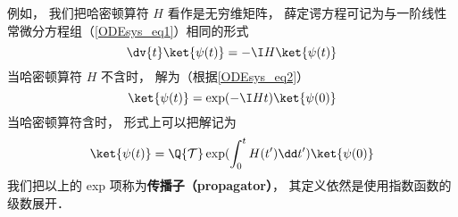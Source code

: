 例如， 我们把哈密顿算符 $H$ 看作是无穷维矩阵， 薛定谔方程可记为与一阶线性常微分方程组（\autoref{ODEsys_eq1}）相同的形式
\begin{equation}
\dv{t} \ket{\psi(t)} = -\I H \ket{\psi(t)}
\end{equation}
当哈密顿算符 $H$ 不含时， 解为（根据\autoref{ODEsys_eq2}）
\begin{equation}
\ket{\psi(t)} = \exp(-\I H t) \ket{\psi(0)}
\end{equation}
当哈密顿算符含时， 形式上可以把解记为
\begin{equation}
\ket{\psi(t)} = \Q {\mathcal T} \exp(\int_0^ t H(t')\dd t') \ket{\psi(0)}
\end{equation}
我们把以上的 exp 项称为\textbf{传播子（propagator）}， 其定义依然是使用指数函数的级数展开．
